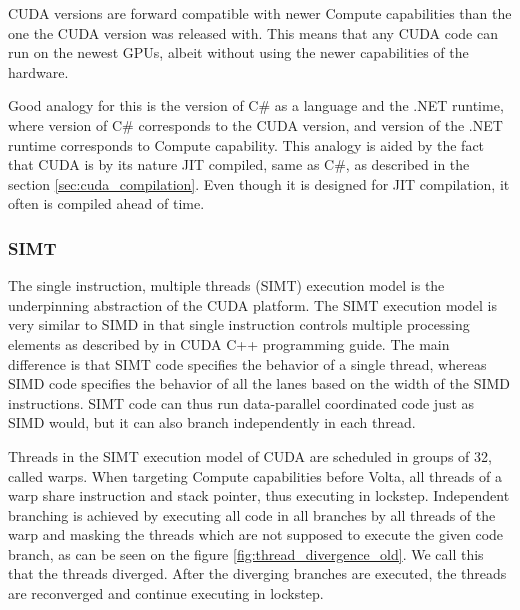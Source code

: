 CUDA versions are forward compatible with newer Compute capabilities than the one the CUDA version was released with. This means that any CUDA code can run on the newest GPUs, albeit without using the newer capabilities of the hardware. 

Good analogy for this is the version of C\# as a language and the .NET runtime, where version of C\# corresponds to the CUDA version, and version of the .NET runtime corresponds to Compute capability. This analogy is aided by the fact that CUDA is by its nature JIT compiled, same as C\#, as described in the section \ref{sec:cuda_compilation}. Even though it is designed for JIT compilation, it often is compiled ahead of time.



\subsubsection{SIMT}
\label{sec:simt}
The single instruction, multiple threads (SIMT) execution model is the underpinning abstraction of the CUDA platform. The SIMT execution model is very similar to SIMD in that single instruction controls multiple processing elements as described by \citep{site:cuda} in CUDA C++ programming guide. The main difference is that SIMT code specifies the behavior of a single thread, whereas SIMD code specifies the behavior of all the lanes based on the width of the SIMD instructions. SIMT code can thus run data-parallel coordinated code just as SIMD would, but it can also branch independently in each thread.

Threads in the SIMT execution model of CUDA are scheduled in groups of 32, called warps. When targeting Compute capabilities before Volta, all threads of a warp share instruction and stack pointer, thus executing in lockstep. Independent branching is achieved by executing all code in all branches by all threads of the warp and masking the threads which are not supposed to execute the given code branch, as can be seen on the figure \ref{fig:thread_divergence_old}. We call this that the threads diverged. After the diverging branches are executed, the threads are reconverged and continue executing in lockstep.  %

